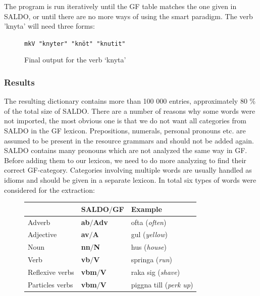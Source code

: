 \documentclass[10pt, a4paper]{article}
\begin{document}
The program is run iteratively until the GF table matches the one given in SALDO,
or until there are no more ways of using the smart paradigm. The verb 'knyta'
will need three forms:\\

\begin{figure}[h]
\begin{center}
\verb-mkV "knyter" "knöt" "knutit"-\\
\caption{Final output for the verb `knyta'}
\label{fig:saldoknyt3}
\end{center}
\end{figure}


\subsubsection{Results}
\label{sec:saldoRes}
The resulting dictionary contains more than 100 000 entries, approximately 80 \% 
of the total size of SALDO.
There are a number of reasons why some words were not imported,
the most obvious one is that we do not want all categories from
SALDO in the GF lexicon. Prepositions, 
numerals, 
personal pronouns etc.
are assumed to be present in the resource grammars and should not be added again.
SALDO contains many pronouns which
are not analyzed the same way in GF. 
Before adding them to our lexicon, we need to do more analyzing to find their
correct GF-category. 
Categories involving multiple words 
are usually handled as idioms and should be given in a separate lexicon. In
total six types of words were considered for the extraction: \\

\begin{figure}[h]
\begin{tabular}{|l|ll|}
\hline
& SALDO$/$GF & Example \\
\hline
 Adverb & \textbf{ab}$/$\textbf{Adv} & ofta (\emph{often})\\
 Adjective&\textbf{av}$/$\textbf{A} & gul (\emph{yellow})\\
 Noun & \textbf{nn}$/$\textbf{N} & hus (\emph{house})\\
 Verb & \textbf{vb}$/$\textbf{V} & springa (\emph{run})\\
 Reflexive verbs &\textbf{vbm}$/$\textbf{V} & raka sig (\emph{shave})\\
 Particles verbs &\textbf{vbm}$/$\textbf{V}  &  piggna till (\emph{perk up})\\
\hline
\end{tabular}
\caption{}
\end{figure}
\end{document}
